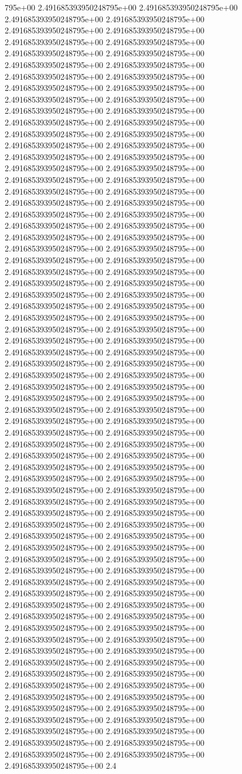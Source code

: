 795e+00	2.491685393950248795e+00	2.491685393950248795e+00	2.491685393950248795e+00	2.491685393950248795e+00	2.491685393950248795e+00	2.491685393950248795e+00	2.491685393950248795e+00	2.491685393950248795e+00	2.491685393950248795e+00	2.491685393950248795e+00	2.491685393950248795e+00	2.491685393950248795e+00	2.491685393950248795e+00	2.491685393950248795e+00	2.491685393950248795e+00	2.491685393950248795e+00	2.491685393950248795e+00	2.491685393950248795e+00	2.491685393950248795e+00	2.491685393950248795e+00	2.491685393950248795e+00	2.491685393950248795e+00	2.491685393950248795e+00	2.491685393950248795e+00	2.491685393950248795e+00	2.491685393950248795e+00	2.491685393950248795e+00	2.491685393950248795e+00	2.491685393950248795e+00	2.491685393950248795e+00	2.491685393950248795e+00	2.491685393950248795e+00	2.491685393950248795e+00	2.491685393950248795e+00	2.491685393950248795e+00	2.491685393950248795e+00	2.491685393950248795e+00	2.491685393950248795e+00	2.491685393950248795e+00	2.491685393950248795e+00	2.491685393950248795e+00	2.491685393950248795e+00	2.491685393950248795e+00	2.491685393950248795e+00	2.491685393950248795e+00	2.491685393950248795e+00	2.491685393950248795e+00	2.491685393950248795e+00	2.491685393950248795e+00	2.491685393950248795e+00	2.491685393950248795e+00	2.491685393950248795e+00	2.491685393950248795e+00	2.491685393950248795e+00	2.491685393950248795e+00	2.491685393950248795e+00	2.491685393950248795e+00	2.491685393950248795e+00	2.491685393950248795e+00	2.491685393950248795e+00	2.491685393950248795e+00	2.491685393950248795e+00	2.491685393950248795e+00	2.491685393950248795e+00	2.491685393950248795e+00	2.491685393950248795e+00	2.491685393950248795e+00	2.491685393950248795e+00	2.491685393950248795e+00	2.491685393950248795e+00	2.491685393950248795e+00	2.491685393950248795e+00	2.491685393950248795e+00	2.491685393950248795e+00	2.491685393950248795e+00	2.491685393950248795e+00	2.491685393950248795e+00	2.491685393950248795e+00	2.491685393950248795e+00	2.491685393950248795e+00	2.491685393950248795e+00	2.491685393950248795e+00	2.491685393950248795e+00	2.491685393950248795e+00	2.491685393950248795e+00	2.491685393950248795e+00	2.491685393950248795e+00	2.491685393950248795e+00	2.491685393950248795e+00	2.491685393950248795e+00	2.491685393950248795e+00	2.491685393950248795e+00	2.491685393950248795e+00	2.491685393950248795e+00	2.491685393950248795e+00	2.491685393950248795e+00	2.491685393950248795e+00	2.491685393950248795e+00	2.491685393950248795e+00	2.491685393950248795e+00	2.491685393950248795e+00	2.491685393950248795e+00	2.491685393950248795e+00	2.491685393950248795e+00	2.491685393950248795e+00	2.491685393950248795e+00	2.491685393950248795e+00	2.491685393950248795e+00	2.491685393950248795e+00	2.491685393950248795e+00	2.491685393950248795e+00	2.491685393950248795e+00	2.491685393950248795e+00	2.491685393950248795e+00	2.491685393950248795e+00	2.491685393950248795e+00	2.491685393950248795e+00	2.491685393950248795e+00	2.491685393950248795e+00	2.491685393950248795e+00	2.491685393950248795e+00	2.491685393950248795e+00	2.491685393950248795e+00	2.491685393950248795e+00	2.491685393950248795e+00	2.491685393950248795e+00	2.491685393950248795e+00	2.491685393950248795e+00	2.491685393950248795e+00	2.491685393950248795e+00	2.491685393950248795e+00	2.491685393950248795e+00	2.491685393950248795e+00	2.4